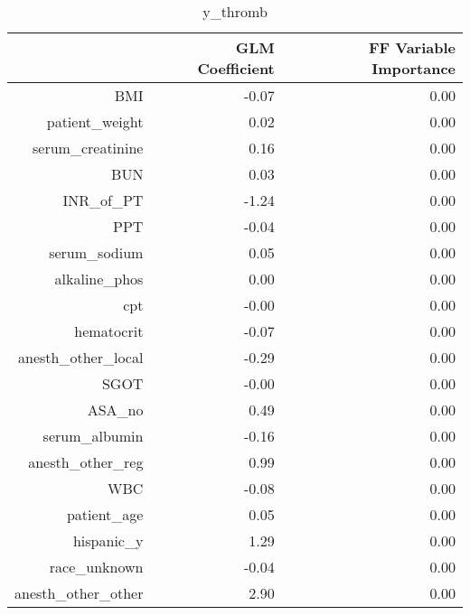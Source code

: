 \begin{table}[ht]
\centering
\begin{tabular}{rrr}
  \hline
 & GLM Coefficient & FF Variable Importance \\ 
  \hline
BMI & -0.07 & 0.00 \\ 
  patient\_weight & 0.02 & 0.00 \\ 
  serum\_creatinine & 0.16 & 0.00 \\ 
  BUN & 0.03 & 0.00 \\ 
  INR\_of\_PT & -1.24 & 0.00 \\ 
  PPT & -0.04 & 0.00 \\ 
  serum\_sodium & 0.05 & 0.00 \\ 
  alkaline\_phos & 0.00 & 0.00 \\ 
  cpt & -0.00 & 0.00 \\ 
  hematocrit & -0.07 & 0.00 \\ 
  anesth\_other\_local & -0.29 & 0.00 \\ 
  SGOT & -0.00 & 0.00 \\ 
  ASA\_no & 0.49 & 0.00 \\ 
  serum\_albumin & -0.16 & 0.00 \\ 
  anesth\_other\_reg & 0.99 & 0.00 \\ 
  WBC & -0.08 & 0.00 \\ 
  patient\_age & 0.05 & 0.00 \\ 
  hispanic\_y & 1.29 & 0.00 \\ 
  race\_unknown & -0.04 & 0.00 \\ 
  anesth\_other\_other & 2.90 & 0.00 \\ 
   \hline
\end{tabular}
\caption{y_thromb} 
\end{table}

